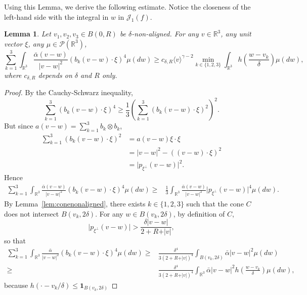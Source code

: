 \documentclass[11pt,a4paper]{article}
\theoremstyle{definition}
\theoremstyle{plain}
\newtheorem{lemma}[defi]{Lemma}
\newcommand{\jap}[1]{\langle #1 \rangle}
\begin{document}
Using this Lemma, we derive the following estimate. Notice the closeness of the left-hand side with the integral in $w$ in $\mathcal{J}_1(f)$.
\begin{lemma}
    \label{lem:ellipticityestimate}
    Let $v_1,v_2,v_3\in B(0,R)$ be $\delta$-non-aligned.
    For any $v\in\mathbb{R}^3$, any unit vector $\xi$, any $\mu\in\mathcal{P}(\mathbb{R}^3)$,
    $$\sum_{k=1}^3\int_{\mathbb{R}^{3}}\frac{\bar{\alpha}(v-w)}{\vert v - w\vert^2} \left( b_k(v-w)\cdot \xi \right)^4 \mu(dw) \geq c_{\delta,R}\jap{v}^{\gamma-2}\min_{k\in\{1,2,3\} }  \int_{\mathbb{R}^3}h\left(\frac{w-v_k}{\delta}\right)\mu(dw),$$
    where $c_{\delta,R}$ depends on $\delta$ and $R$ only.
\end{lemma}
\begin{proof}
    By the Cauchy-Schwarz inequality,
    $$\sum_{k=1}^3\left( b_k(v-w)\cdot \xi \right)^4 \geq \frac{1}{3}\left(\sum_{k=1}^3\left( b_k(v-w)\cdot \xi \right)^2\right)^2.$$
    But since $a(v-w)=\sum_{k=1}^3 b_k\otimes b_k$,
    \begin{align*}
    \sum_{k=1}^3\left( b_k(v-w)\cdot \xi \right)^2&=a(v-w)\xi \cdot \xi\\
    &=\vert v-w\vert^2-((v-w)\cdot\xi)^2\\
    &=\vert p_{\xi^\perp}(v-w)\vert ^2.
    \end{align*}
    Hence
    \begin{align*}
        \sum_{k=1}^3\int_{\mathbb{R}^{3}}\frac{\bar{\alpha}(v-w)}{\vert v - w\vert^2} \left( b_k(v-w)\cdot \xi \right)^4 \mu(dw) \geq &\frac{1}{3}\int_{\mathbb{R}^{3}}\frac{\bar{\alpha}(v-w)}{\vert v - w\vert^2} \vert p_{\xi^\perp}(v-w)\vert^4 \mu(dw).
    \end{align*}
    By Lemma~\ref{lem:conenonaligned}, there exists $k\in\{1,2,3\}$ such that the cone $C$ does not intersect $B(v_k,2\delta)$. For any $w\in B(v_k,2\delta)$, by definition of $C$,
    $$\vert p_{\xi^\perp}(v-w)\vert > \frac{\delta \vert v-w\vert}{2+R+\vert v\vert},$$
    so that
    \begin{align*}
        \sum_{k=1}^3\int_{\mathbb{R}^{3}}\frac{\bar{\alpha}}{\vert v - w\vert^2} \left( b_k(v-w)\cdot \xi \right)^4 \mu(dw) \geq &\frac{\delta^4}{3(2+R+\vert v\vert)^4} \int_{B(v_k,2\delta)}\bar{\alpha}\vert v - w\vert^2\mu(dw)\\
        \geq&\frac{\delta^4}{3(2+R+\vert v\vert)^4} \int_{\mathbb{R}^{3}}\bar{\alpha}\vert v - w\vert^2h\left(\frac{w-v_k}{\delta}\right)\mu(dw),
    \end{align*}
    because $h(\cdot-v_k/\delta) \leq \mathbf{1}_{B(v_k,2\delta)}$

\end{proof}
\end{document}
